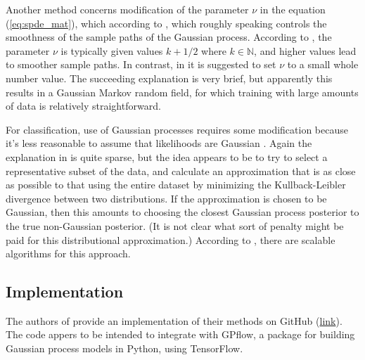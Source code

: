 Another method concerns modification of the parameter $\nu$ in the equation (\ref{eq:spde_mat}), which according to \cite{pmlr-v130-borovitskiy21a}, which roughly speaking controls the smoothness of the sample paths of the Gaussian process. According to \cite{garnett_bayesoptbook_2023}, the parameter $\nu$ is typically given values $k + 1/2$ where $k \in \mathbb N$, and higher values lead to smoother sample paths. In contrast, in \cite{pmlr-v130-borovitskiy21a} it is suggested to set $\nu$ to a small whole number value. The succeeding explanation is very brief, but apparently this results in a Gaussian Markov random field, for which training with large amounts of data is relatively straightforward.

For classification, use of Gaussian processes requires some modification because it's less reasonable to assume that likelihoods are Gaussian \cite{rw}. Again the explanation in \cite{pmlr-v130-borovitskiy21a} is quite sparse, but the idea appears to be to try to select a representative subset of the data, and calculate an approximation that is as close as possible to that using the entire dataset by minimizing the Kullback-Leibler divergence between two distributions. If the approximation is chosen to be Gaussian, then this amounts to choosing the closest Gaussian process posterior to the true non-Gaussian posterior. (It is not clear what sort of penalty might be paid for this distributional approximation.) According to \cite{pmlr-v130-borovitskiy21a}, there are scalable algorithms for this approach.

\subsection{Implementation}

The authors of \cite{pmlr-v130-borovitskiy21a} provide an implementation of their methods on GitHub (\href{https://github.com/spbu-math-cs/Graph-Gaussian-Processes}{link}). The code appers to be intended to integrate with GPflow, a package for building Gaussian process models in Python, using TensorFlow.



